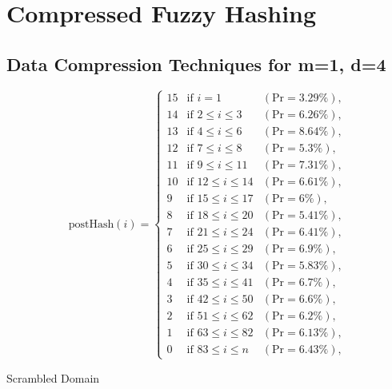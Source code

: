 \section{Compressed Fuzzy Hashing}

\subsection{Data Compression Techniques for m=1, d=4}

{
\renewcommand{\arraystretch}{1.25}
\[
\text{postHash}(i) = \left\{
\begin{array}{lll}
    \text{15} & \text{if } i = 1 & (\text{Pr} = 3.29\%), \\
    \text{14} & \text{if } 2 \leq i \leq 3 & (\text{Pr} = 6.26\%), \\
    \text{13} & \text{if } 4 \leq i \leq 6 & (\text{Pr} = 8.64\%), \\
    \text{12} & \text{if } 7 \leq i \leq 8 & (\text{Pr} = 5.3\%), \\
    \text{11} & \text{if } 9 \leq i \leq 11 & (\text{Pr} = 7.31\%), \\
    \text{10} & \text{if } 12 \leq i \leq 14 & (\text{Pr} = 6.61\%), \\
    \text{9} & \text{if } 15 \leq i \leq 17 & (\text{Pr} = 6\%), \\
    \text{8} & \text{if } 18 \leq i \leq 20 & (\text{Pr} = 5.41\%), \\
    \text{7} & \text{if } 21 \leq i \leq 24 & (\text{Pr} = 6.41\%), \\
    \text{6} & \text{if } 25 \leq i \leq 29 & (\text{Pr} = 6.9\%), \\
    \text{5} & \text{if } 30 \leq i \leq 34 & (\text{Pr} = 5.83\%), \\
    \text{4} & \text{if } 35 \leq i \leq 41 & (\text{Pr} = 6.7\%), \\
    \text{3} & \text{if } 42 \leq i \leq 50 & (\text{Pr} = 6.6\%), \\
    \text{2} & \text{if } 51 \leq i \leq 62 & (\text{Pr} = 6.2\%), \\
    \text{1} & \text{if } 63 \leq i \leq 82 & (\text{Pr} = 6.13\%), \\
    \text{0} & \text{if } 83 \leq i \leq n & (\text{Pr} = 6.43\%),
\end{array}
\right.
\]
}


Scrambled Domain

